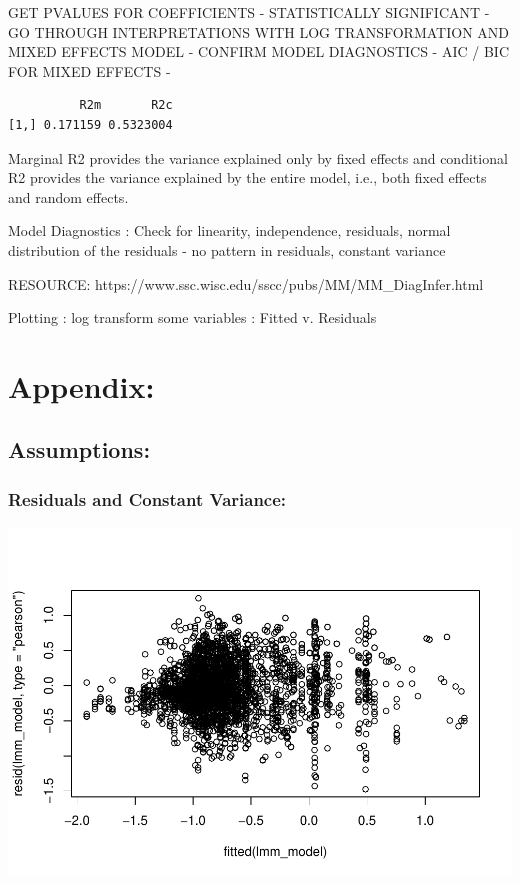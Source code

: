 \documentclass[
  letterpaper,
  DIV=11,
  numbers=noendperiod]{scrreprt}
\begin{document}
GET PVALUES FOR COEFFICIENTS - STATISTICALLY SIGNIFICANT - GO THROUGH
INTERPRETATIONS WITH LOG TRANSFORMATION AND MIXED EFFECTS MODEL -
CONFIRM MODEL DIAGNOSTICS - AIC / BIC FOR MIXED EFFECTS -

\begin{verbatim}
          R2m       R2c
[1,] 0.171159 0.5323004
\end{verbatim}

Marginal R2 provides the variance explained only by fixed effects and
conditional R2 provides the variance explained by the entire model,
i.e., both fixed effects and random effects.

Model Diagnostics : Check for linearity, independence, residuals, normal
distribution of the residuals - no pattern in residuals, constant
variance

RESOURCE: https://www.ssc.wisc.edu/sscc/pubs/MM/MM\_DiagInfer.html

Plotting : log transform some variables : Fitted v. Residuals

\hypertarget{appendix}{%
\chapter{Appendix:}\label{appendix}}

\hypertarget{assumptions}{%
\section{Assumptions:}\label{assumptions}}

\hypertarget{residuals-and-constant-variance}{%
\subsection{Residuals and Constant
Variance:}\label{residuals-and-constant-variance}}

\includegraphics{Chapter2/Chapter2_files/figure-pdf/diagnostics-1.pdf}
\end{document}
